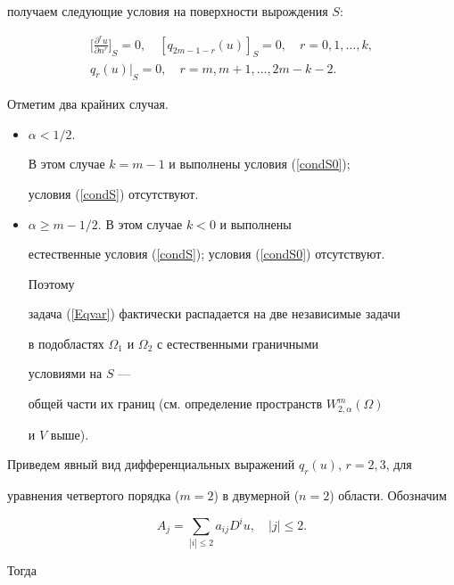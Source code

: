 получаем следующие условия на поверхности вырождения $S$:


\begin{gather} \label{condS0}


{\bigg[ \frac{\partial ^r u}{\partial n^r} \bigg]}_S=0, \quad


{[q_{2m-1-r}(u)]}_S=0, \quad r=0,1,\dotsc,k, \\


\label{condS}


{q_r(u)|}_S=0, \quad r=m,m+1,\dotsc, 2m-k-2. 


\end{gather}





Отметим два крайних случая.


\begin{itemize}


\item[1.] $\alpha < 1/2$.


В этом случае $k=m-1$ и выполнены условия (\ref{condS0}); 


условия (\ref{condS}) отсутствуют.


\item[2.] $\alpha \geq m-1/2$. В этом случае $k < 0$ и выполнены 


естественные условия (\ref{condS}); условия (\ref{condS0}) отсутствуют.


Поэтому


задача (\ref{Eqvar}) фактически распадается на две независимые задачи


в подобластях $\Omega_1$ и $\Omega_2$ с естественными граничными


условиями на $S$ ---


общей части их границ (см. определение пространств $W_{2, \alpha}^m(\Omega)$


и $V$ выше). 


\end{itemize}





Приведем явный вид дифференциальных выражений $q_r(u)$, $r=2,3$, для 


уравнения четвертого порядка ($m=2$) в двумерной ($n=2$) области. Обозначим


$$


A_j = \sum_{|i| \leq 2} a_{ij} D^i u, \quad |j| \leq 2.


$$


Тогда


